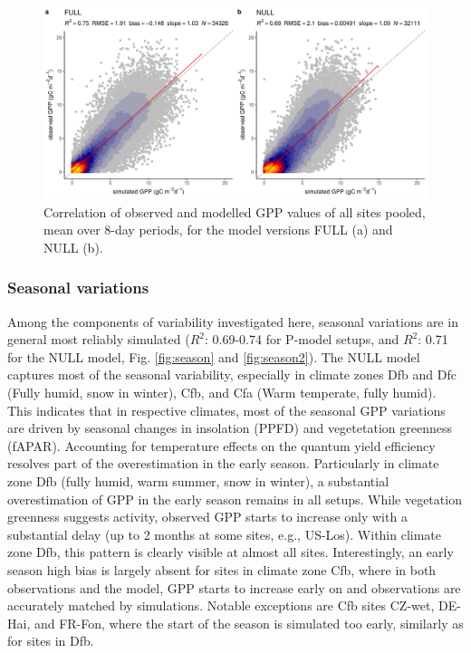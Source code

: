 \documentclass{myreport}
\newcommand{\rsq}{$R^2$}
\begin{document}
\begin{figure}[!ht]
    \includegraphics[width=\textwidth]{fig/modobs_xdaily.pdf}
    \caption{Correlation of observed and modelled GPP values of all sites pooled, mean over 8-day periods, for the model versions FULL (a) and NULL (b).}
    \label{fig:modobs_xdaily}
\end{figure}

\subsubsection{Seasonal variations}
\label{sec:results_seasonal}
Among the components of variability investigated here, seasonal variations are in general most reliably simulated (\rsq : 0.69-0.74 for P-model setups, and \rsq : 0.71 for the NULL model, Fig. \ref{fig:season} and \ref{fig:season2}). The NULL model captures most of the seasonal variability, especially in climate zones Dfb and Dfc (Fully humid, snow in winter), Cfb, and Cfa (Warm temperate, fully humid). This indicates that in respective climates, most of the  seasonal GPP variations are driven by seasonal changes in insolation (PPFD) and vegetetation greenness (fAPAR). Accounting for temperature effects on the quantum yield efficiency resolves part of the overestimation in the early season. Particularly in climate zone Dfb (fully humid, warm summer, snow in winter), a substantial overestimation of GPP in the early season remains in all setups. While vegetation greenness suggests activity, observed GPP starts to increase only with a substantial delay (up to 2 months at some sites, e.g., US-Los). Within climate zone Dfb, this pattern is clearly visible at almost all sites. Interestingly, an early season high bias is largely absent for sites in climate zone Cfb, where in both observations and the model, GPP starts to increase early on and observations are accurately matched by simulations. Notable exceptions are Cfb sites CZ-wet, DE-Hai, and FR-Fon, where the start of the season is simulated too early, similarly as for sites in Dfb.
\end{document}
